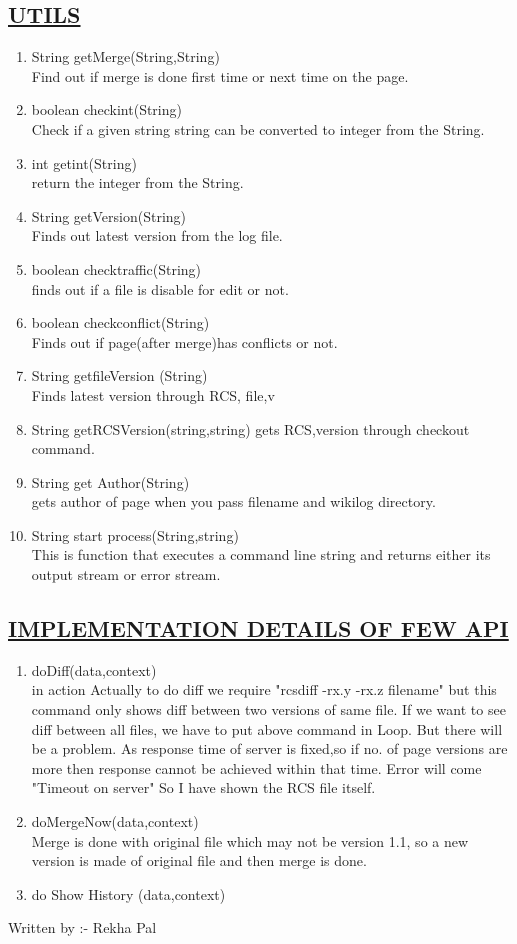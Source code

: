 \documentclass{article}
\begin{document}
\subsection*{\underline{UTILS}}
\begin{enumerate}
\item String getMerge(String,String)\\
Find out if merge is done first time or next time on the page.
\item boolean checkint(String)\\
Check if a given string string can be converted to integer from the String.
\item int getint(String)\\
return the integer from the String.
\item String getVersion(String)\\
Finds out latest version from the log file.
\item boolean checktraffic(String)\\
finds out if a file is disable for edit or not.
\item boolean checkconflict(String)\\
Finds out if page(after merge)has conflicts or not.
\item String getfileVersion (String)\\
Finds latest version through RCS, file,v
\item String getRCSVersion(string,string)
gets RCS,version through checkout command.
\item String get Author(String)\\
gets author of page when you pass filename and wikilog directory.
\item String start process(String,string)\\
This is function that executes a command line string and returns either its output stream or error stream.
\end{enumerate}
\subsection*{\underline{IMPLEMENTATION DETAILS OF FEW API}}
\begin{enumerate}
\item doDiff(data,context)\\
 in action Actually to do diff we require
"rcsdiff -rx.y -rx.z filename"
but this command only shows diff between two versions of same file.
If we want to see diff between all files, we have to put above command in Loop.
But there will be a problem. As response time of server is fixed,so if no. of 
page versions are more then response cannot be achieved within that time. Error will come
"Timeout on server"
So I have shown the RCS file itself.
\item doMergeNow(data,context)\\
Merge is done with original file which may not be version 1.1,
so a new version is made of original file and then merge is done.
\item do Show History (data,context)\\
\end{enumerate} 
Written by :- Rekha Pal 
\end{document}
